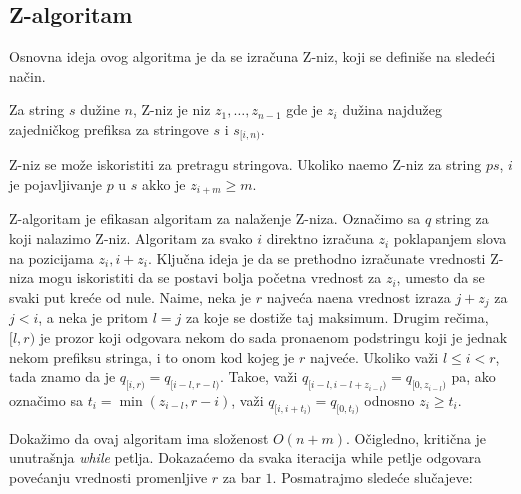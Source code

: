 \noindent
\begin{minipage}[l]{\textwidth}

\end{minipage}

\subsection{Z-algoritam}

Osnovna ideja ovog algoritma je da se izra\v cuna Z-niz, koji se defini\v se na slede\' ci na\v cin.

\begin{dfn}
Za string $s$ du\v zine $n$, Z-niz je niz $z_1, \ldots, z_{n-1}$ gde je $z_i$ du\v zina najdu\v zeg zajedni\v ckog prefiksa za stringove $s$ i $s_{[i, n)}$.
\end{dfn}

Z-niz se mo\v ze iskoristiti za pretragu stringova. Ukoliko na\dj emo Z-niz za string $ps$, $i$ je pojavljivanje $p$ u $s$ akko je $z_{i+m} \geq m$.

Z-algoritam je efikasan algoritam za nala\v zenje Z-niza.\cite{zalgoknjiga} Ozna\v cimo sa $q$ string za koji nalazimo Z-niz. Algoritam za svako $i$ direktno izra\v cuna $z_i$ poklapanjem slova na pozicijama $z_i, i + z_i$. Klju\v cna ideja je da se prethodno izra\v cunate vrednosti Z-niza mogu iskoristiti da se postavi bolja po\v cetna vrednost za $z_i$, umesto da se svaki put kre\' ce od nule. Naime, neka je $r$ najve\' ca na\dj ena vrednost izraza $j+z_j$ za $j<i$, a neka je pritom $l = j$ za koje se dosti\v ze taj maksimum. Drugim re\v cima, $[l, r)$ je prozor koji odgovara nekom do sada prona\dj enom podstringu koji je jednak nekom prefiksu stringa, i to onom kod kojeg je $r$ najve\' ce. Ukoliko va\v zi $l \leq i < r$, tada znamo da je $q_{[i, r)} = q_{[i-l, r-l)}$. Tako\dj e, va\v zi $q_{[i-l, i-l+z_{i-l})} = q_{[0, z_{i-l})}$ pa, ako ozna\v cimo sa $t_i = \min(z_{i-l}, r-i)$, va\v zi $q_{[i, i+t_i)} = q_{[0, t_i)}$ odnosno $z_i \geq t_i$.



Doka\v zimo da ovaj algoritam ima slo\v zenost $O(n+m)$. O\v cigledno, kriti\v cna je unutra\v snja \textit{while} petlja. Dokaza\' cemo da svaka iteracija while petlje odgovara pove\' canju vrednosti promenljive $r$ za bar $1$. Posmatrajmo slede\' ce slu\v cajeve:


